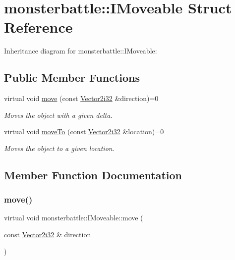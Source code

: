 \hypertarget{structmonsterbattle_1_1IMoveable}{}\section{monsterbattle\+:\+:I\+Moveable Struct Reference}
\label{structmonsterbattle_1_1IMoveable}


Inheritance diagram for monsterbattle\+:\+:I\+Moveable\+:
\subsection*{Public Member Functions}
\begin{DoxyCompactItemize}
\item 
virtual void \hyperlink{structmonsterbattle_1_1IMoveable_a487ec192d82b97e4c5b6d4706fc8db17}{move} (const \hyperlink{structmonsterbattle_1_1Vector}{Vector2i32} \&direction)=0
\begin{DoxyCompactList}\small\item\em Moves the object with a given delta. \end{DoxyCompactList}\item 
virtual void \hyperlink{structmonsterbattle_1_1IMoveable_a61cc433b2a635cc3c52d807fc446a6a4}{move\+To} (const \hyperlink{structmonsterbattle_1_1Vector}{Vector2i32} \&location)=0
\begin{DoxyCompactList}\small\item\em Moves the object to a given location. \end{DoxyCompactList}\end{DoxyCompactItemize}


\subsection{Member Function Documentation}
\mbox{\label{structmonsterbattle_1_1IMoveable_a487ec192d82b97e4c5b6d4706fc8db17}} 
\subsubsection{\texorpdfstring{move()}{move()}}
{\footnotesize\ttfamily virtual void monsterbattle\+::\+I\+Moveable\+::move (\begin{DoxyParamCaption}\item[{const \hyperlink{structmonsterbattle_1_1Vector}{Vector2i32} \&}]{direction }\end{DoxyParamCaption})\hspace{0.3cm}{\ttfamily [pure virtual]}}



